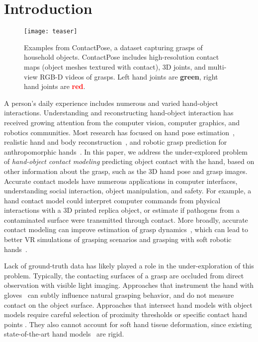 \documentclass[runningheads]{llncs}
\begin{document}
\section{Introduction} \label{sec:intro}
\begin{figure}
\centering
\texttt{[image: teaser]}
\caption{Examples from ContactPose, a dataset capturing grasps of household objects. ContactPose includes high-resolution contact maps (object meshes textured with contact), 3D joints, and multi-view RGB-D videos of grasps. Left hand joints are \textbf{\textcolor{OliveGreen}{green}}, right hand joints are \textbf{\textcolor{red}{red}}.}
\label{fig:teaser}
\end{figure}
A person's daily experience includes numerous and varied hand-object interactions. Understanding and reconstructing hand-object interaction has received growing attention from the computer vision, computer graphics, and robotics communities. Most research has focused on hand pose estimation~\cite{NYUDataset,simon2017hand,FHAD_FirstPersonAction,tekin2019h+}, realistic hand and body reconstruction~\cite{handsInActionDataset,learningJointReconstructionOfHandsAndManipulatedObjects,Hassan_2019_ICCV,Zhang_2019_ICCV}, and robotic grasp prediction for anthropomorphic hands~\cite{brahmbhatt2019contactgrasp,lu2017planning}. In this paper, we address the under-explored problem of \textit{hand-object contact modeling} \ie predicting object contact with the hand, based on other information about the grasp, such as the 3D hand pose and grasp images. Accurate contact models have numerous applications in computer interfaces, understanding social interaction, object manipulation, and safety. For example, a hand contact model could interpret computer commands from physical interactions with a 3D printed replica object, or estimate if pathogens from a contaminated surface were transmitted through contact. More broadly, accurate contact modeling can improve estimation of grasp dynamics~\cite{ferrari1992planning,pollard1994parallel,graspit, mahler2019learning}, which can lead to better VR simulations of grasping scenarios and grasping with soft robotic hands~\cite{deimel2016novel,homberg2015haptic}.

Lack of ground-truth data has likely played a role in the under-exploration of this problem. Typically, the contacting surfaces of a grasp are occluded from direct observation with visible light imaging. Approaches that instrument the hand with gloves~\cite{wade2017force, tactileGloveNature} can subtly influence natural grasping behavior, and do not measure contact on the object surface. Approaches that intersect hand models with object models require careful selection of proximity thresholds or specific contact hand points \cite{learningJointReconstructionOfHandsAndManipulatedObjects, handsInActionDataset}. They also cannot account for soft hand tissue deformation, since existing state-of-the-art hand models~\cite{romero2017embodied} are rigid.
\end{document}
